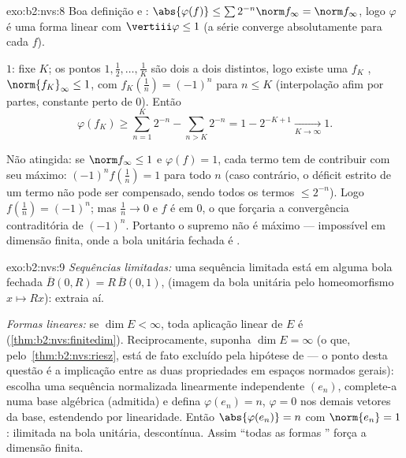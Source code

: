 \begin{solution}{exo:b2:nvs:8}
Boa definição e : $\abs{\varphi(f)} \leq \sum 2^{-n}
\norm f_\infty = \norm f_\infty$, logo $\varphi$ é uma forma linear
com $\vertiii\varphi \leq 1$ (a série converge absolutamente para
cada $f$).

 $1$: fixe $K$; os pontos $1, \frac12, \dots, \frac1K$ são
dois a dois distintos, logo existe uma $f_K$ , $\norm{f_K}_\infty
\leq 1$, com $f_K(\frac1n) = (-1)^n$ para $n \leq K$ (interpolação
afim por partes, constante perto de $0$). Então
\[
\varphi(f_K) \geq \sum_{n=1}^{K} 2^{-n} - \sum_{n > K} 2^{-n}
= 1 - 2^{-K+1} \xrightarrow[K \to \infty]{} 1 .
\]

Não atingida: se $\norm f_\infty \leq 1$ e $\varphi(f) = 1$, cada
termo tem de contribuir com seu máximo: $(-1)^n f(\frac1n) = 1$ para todo
$n$ (caso contrário, o déficit estrito de um termo não pode ser compensado,
sendo todos os termos $\leq 2^{-n}$). Logo $f(\frac1n) = (-1)^n$; mas
$\frac1n \to 0$ e $f$ é  em $0$, o que forçaria a
convergência contraditória de $(-1)^n$. Portanto o supremo não é
máximo --- impossível em dimensão finita, onde a bola unitária
fechada é .
\end{solution}

\begin{solution}{exo:b2:nvs:9}
\emph{Sequências limitadas:} uma sequência limitada está em alguma bola
fechada $\overline B(0, R) = R\,\overline B(0,1)$,  (imagem
da bola unitária  pelo homeomorfismo $x \mapsto Rx$):
extraia aí.

\emph{Formas lineares:} se $\dim E < \infty$, toda aplicação linear de
$E$ é  (\cref{thm:b2:nvs:finitedim}). Reciprocamente,
suponha $\dim E = \infty$ (o que, pelo~\cref{thm:b2:nvs:riesz},
está de fato excluído pela hipótese de  --- o ponto
desta questão é a implicação entre as duas propriedades em
espaços normados gerais): escolha uma sequência normalizada linearmente
independente $(e_n)$, complete-a numa base algébrica (admitida)
e defina $\varphi(e_n) = n$, $\varphi = 0$ nos demais vetores da
base, estendendo por linearidade. Então $\abs{\varphi(e_n)} = n$ com
$\norm{e_n} = 1$: ilimitada na bola unitária, descontínua. Assim
``todas as formas '' força a dimensão finita.
\end{solution}


